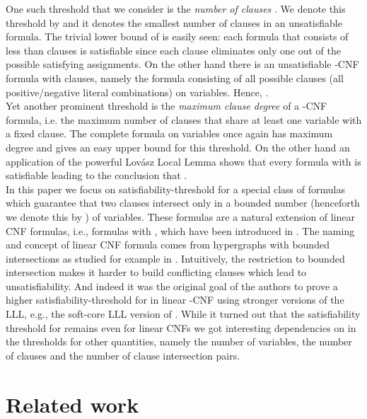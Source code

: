 \documentclass[11pt,letterpaper]{article}
\begin{document}
One such threshold that we consider is the \emph{number of clauses} . We denote this threshold by  and it denotes the smallest number of clauses in an unsatisfiable formula. The trivial lower bound of  is easily seen: each formula that consists of less than  clauses is satisfiable since each clause eliminates only one out of the  possible satisfying assignments. On the other hand there is an unsatisfiable -CNF formula with  clauses, namely the formula consisting of all possible  clauses (all positive/negative literal combinations) on  variables. Hence, .\\ 

Yet another prominent threshold is the \emph{maximum clause degree}  of a -CNF formula, i.e. the maximum number of clauses that share at least one variable with a fixed clause. The complete formula on  variables once again has maximum degree  and gives an easy upper bound for this threshold. On the other hand an application of the powerful Lov\'asz Local Lemma \cite{ErdoesLovasz} shows that every formula with  is satisfiable leading to the conclusion that .\\


In this paper we focus on satisfiability-threshold for a special class of formulas which guarantee that two clauses intersect only in a bounded number (henceforth we denote this by ) of variables. These formulas are a natural extension of linear CNF formulas, i.e., formulas with , which have been introduced in \cite{porschen2009linear}. The naming and concept of linear CNF formula comes from hypergraphs with bounded intersections as studied for example in \cite{ErdoesLovasz}. Intuitively, the restriction to bounded intersection makes it harder to build conflicting clauses which lead to unsatisfiability. And indeed it was the original goal of the authors to prove a higher satisfiability-threshold for  in linear -CNF using stronger versions of the LLL, e.g., the soft-core LLL version of \cite{scott2005repulsive}. While it turned out that the satisfiability threshold for  remains  even for linear CNFs we got interesting dependencies on  in the thresholds for other quantities, namely the number of variables, the number of clauses and the number of clause intersection pairs.




\section{Related work}
\end{document}
